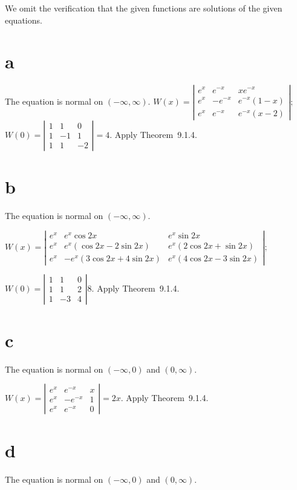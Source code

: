 \documentclass[dvips]{book}
\renewcommand{\exer}[1]{\par\medskip\;\noindent{\color{red}\bf #1.}}
\numberwithin{example}{section}
\numberwithin{equation}{section}
\numberwithin{theorem}{section}
\numberwithin{table}{section}
\numberwithin{figure}{section}
\begin{document}
\exer{9.1.6}
We omit the verification that the given functions are solutions of the
given equations.

\part{a}
The equation is normal on $(-\infty,\infty)$.
$W(x)=\left|\begin{array}{cccc}e^x&e^{-x}&xe^{-x}\\
e^x&-e^{-x}&e^{-x}(1-x)\\e^x&e^{-x}&e^{-x}
(x-2)\end{array}\right|$;
$W(0)=
\left|\begin{array}{cccc}1&1&0\\1&-1&1\\1&1&-2\end{array}\right|=4$.
Apply  Theorem~9.1.4.

\part{b}
The equation is normal on $(-\infty,\infty)$.

$W(x)=
\left|\begin{array}{cccc}e^x&e^x\cos 2x&e^x\sin 2x\\
e^x&e^x(\cos 2x-2\sin 2x)&e^x(2\cos2x
+\sin 2x)\\e^x&-e^x(3\cos 2x+4\sin 2x)&e^x(4\cos 2x-3\sin2x
)\end{array}\right|$;

$W(0)=
\left|\begin{array}{cccc}1&1&0\\1&1&2\\1&-3&4\end{array}\right|
8$. Apply  Theorem~9.1.4.

\part{c}
The equation is normal on $(-\infty,0)$ and $(0,\infty)$.

$W(x)=
\left|\begin{array}{cccc}e^x&e^{-x}&x\\e^x&-e^{-x}&1\\
e^x&e^{-x}&0\end{array}\right|=2x$.
Apply  Theorem~9.1.4.

\part{d}
The equation is normal on $(-\infty,0)$ and $(0,\infty)$.
\end{document}
